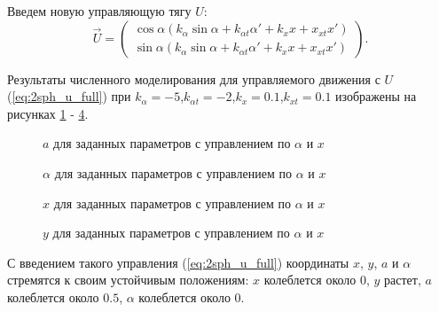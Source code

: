 Введем новую управляющую тягу $U$:
\begin{equation}
\label{eq:2sph_u_full}
	\vec{U} = 
	\begin{pmatrix}
		\cos \alpha \left(k_\alpha \sin \alpha + k_{\alpha t}\alpha' + k_x x + x_{xt} x'\right)\\
		\sin \alpha \left(k_\alpha \sin \alpha + k_{\alpha t}\alpha' + k_x x + x_{xt} x'\right)
	\end{pmatrix}.
\end{equation}

Результаты численного моделирования для управляемого движения с $U$ (\ref{eq:2sph_u_full}) при $k_\alpha = -5$,$k_{\alpha t} = -2$,$k_x = 0.1$,$k_{x t} = 0.1$ изображены на рисунках \ref{ris:2sph_a_full_u} - \ref{ris:2sph_y_full_u}.

\begin{figure}[H]
	\caption{$a$ для заданных параметров с управлением по $\alpha$ и $x$}
	\label{ris:2sph_a_full_u}
\end{figure}
\begin{figure}[H]
	\caption{$\alpha$ для заданных параметров с управлением по $\alpha$ и $x$}
	\label{ris:2sph_alpha_full_u}
\end{figure} 
\begin{figure}[H]
	\caption{$x$ для заданных параметров с управлением по $\alpha$ и $x$}
	\label{ris:2sph_x_full_u}
\end{figure} 
\begin{figure}[H]
	\caption{$y$ для заданных параметров с управлением по $\alpha$ и $x$}
	\label{ris:2sph_y_full_u}
\end{figure} 

С введением такого управления (\ref{eq:2sph_u_full}) координаты $x$, $y$, $a$ и $\alpha$ стремятся к своим устойчивым положениям: $x$ колеблется около 0, $y$ растет,  $a$ колеблется около $0.5$, $\alpha$ колеблется около 0.

